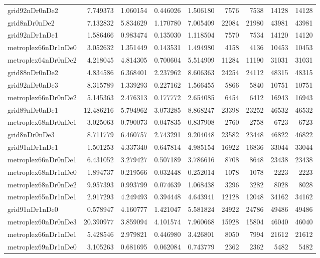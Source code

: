\begin{longtable}{|l|r|r|r|r|r|r|r|r|}
grid92nDr0nDe2 & 7.749373 & 1.060154 & 0.446026 & 1.506180 & 7576 & 7538 & 14128 & 14128 \\
grid8nDr0nDe2 & 7.132832 & 5.834629 & 1.170780 & 7.005409 & 22084 & 21980 & 43981 & 43981 \\
grid92nDr1nDe1 & 1.586466 & 0.983474 & 0.135030 & 1.118504 & 7570 & 7534 & 14120 & 14120 \\
metroplex66nDr1nDe0 & 3.052632 & 1.351449 & 0.143531 & 1.494980 & 4158 & 4136 & 10453 & 10453 \\
metroplex64nDr0nDe2 & 4.218045 & 4.814305 & 0.700604 & 5.514909 & 11284 & 11190 & 31031 & 31031 \\
grid88nDr0nDe2 & 4.834586 & 6.368401 & 2.237962 & 8.606363 & 24254 & 24112 & 48315 & 48315 \\
grid92nDr0nDe3 & 8.315789 & 1.339293 & 0.227162 & 1.566455 & 5866 & 5840 & 10751 & 10751 \\
metroplex66nDr0nDe2 & 5.145363 & 2.476313 & 0.177772 & 2.654085 & 6454 & 6412 & 16943 & 16943 \\
grid89nDr0nDe1 & 12.486216 & 5.794962 & 3.073285 & 8.868247 & 23398 & 23252 & 46532 & 46532 \\
metroplex68nDr0nDe1 & 3.025063 & 0.790073 & 0.047835 & 0.837908 & 2760 & 2758 & 6723 & 6723 \\
grid8nDr0nDe3 & 8.711779 & 6.460757 & 2.743291 & 9.204048 & 23582 & 23448 & 46822 & 46822 \\
grid91nDr1nDe1 & 1.501253 & 4.337340 & 0.647814 & 4.985154 & 16922 & 16836 & 33044 & 33044 \\
metroplex66nDr0nDe1 & 6.431052 & 3.279427 & 0.507189 & 3.786616 & 8708 & 8648 & 23438 & 23438 \\
metroplex68nDr1nDe0 & 1.894737 & 0.219566 & 0.032448 & 0.252014 & 1078 & 1078 & 2223 & 2223 \\
metroplex68nDr0nDe2 & 9.957393 & 0.993799 & 0.074639 & 1.068438 & 3296 & 3282 & 8028 & 8028 \\
metroplex65nDr1nDe1 & 2.917293 & 4.249493 & 0.394448 & 4.643941 & 12128 & 12048 & 34162 & 34162 \\
grid91nDr1nDe0 & 0.578947 & 4.160777 & 1.421047 & 5.581824 & 24922 & 24786 & 49486 & 49486 \\
metroplex60nDr0nDe3 & 20.390977 & 3.859094 & 4.101574 & 7.960668 & 15928 & 15804 & 46040 & 46040 \\
metroplex66nDr1nDe1 & 5.428546 & 2.979821 & 0.446980 & 3.426801 & 8050 & 7994 & 21612 & 21612 \\
metroplex69nDr1nDe0 & 3.105263 & 0.681695 & 0.062084 & 0.743779 & 2362 & 2362 & 5482 & 5482 \\

\end{longtable}
